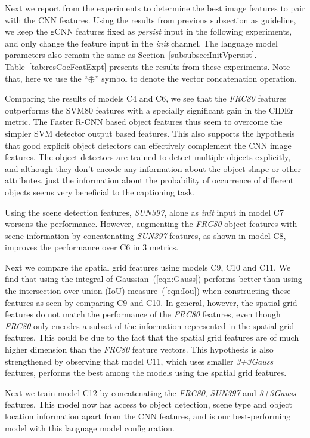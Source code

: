 Next we report from the experiments to determine the best image features to pair
with the CNN features.
Using the results from previous subsection as guideline, we keep the gCNN
features fixed as \emph{persist} input in the following experiments, and only change the
feature input in the \emph{init} channel.
The language model parameters also remain the same as
Section~\ref{subsubsec:InitVpersist}.
Table~\ref{tab:resCocFeatExpt} presents the results from these experiments.
Note that, here we use the ``$\oplus$'' symbol to denote the vector
concatenation operation.

Comparing the results of models C4 and C6, we see that the \emph{FRC80} features
outperforms the SVM80 features with a specially significant gain in the CIDEr
metric.
The Faster R-CNN based object features thus seem to overcome the simpler SVM
detector output based features.
This also supports the hypothesis that good explicit object detectors can
effectively complement the CNN image features. 
The object detectors are trained to detect multiple objects explicitly, and
although they don't encode any information about the object shape or other
attributes, just the information about the probability of occurrence of different
objects seems very beneficial to the captioning task.

Using the scene detection features, \emph{SUN397}, alone as \emph{init} input in
model C7 worsens the performance.
However, augmenting the \emph{FRC80} object features with scene information by
concatenating \emph{SUN397} features, as shown in model C8, improves the
performance over C6 in 3 metrics.

Next we compare the spatial grid features using models C9, C10 and C11.
We find that using the integral of Gaussian~(\ref{eqn:Gauss}) performs better
than using the intersection-over-union (IoU) measure~(\ref{eqn:Iou}) when
constructing these features as seen by comparing C9 and C10. 
In general, however, the spatial grid features do not match the performance of
the \emph{FRC80} features, even though \emph{FRC80} only encodes a subset of the
information represented in the spatial grid features.
This could be due to the fact that the spatial grid features are of much higher
dimension than the \emph{FRC80} feature vectors.
This hypothesis is also strengthened by observing that model C11, which uses
smaller \emph{3+3Gauss} features, performs the best among the models using the
spatial grid features.

Next we train model C12 by concatenating the \emph{FRC80}, \emph{SUN397}  and
\emph{3+3Gauss} features. 
This model now has access to object detection, scene type and object location
information apart from the CNN features, and is our best-performing model with
this language model configuration.

